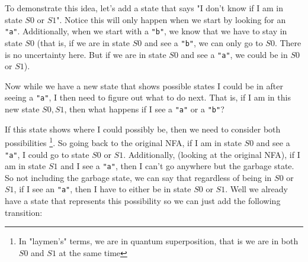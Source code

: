 \documentclass[main.tex]{subfiles}
\begin{document}
To demonstrate this idea, let's add a state that says "I don't know if I am in state $S0$ or $S1$". Notice this will only happen when we start by looking for an \texttt{"a"}. Additionally, when we start with a \texttt{"b"}, we know that we have to stay in state $S0$ (that is, if we are in state $S0$ and see a \texttt{"b"}, we can only go to $S0$. There is no uncertainty here. But if we are in state $S0$ and see a \texttt{"a"}, we could be in $S0$ or $S1$). 
\begin{center}
\end{center}
Now while we have a new state that shows possible states I could be in after seeing a \texttt{"a"}, I then need to figure out what to do next. That is, if I am in this new state $S0,S1$, then what happens if I see a \texttt{"a"} or a \texttt{"b"}? 

If this state shows where I could possibly be, then we need to consider both possibilities \footnote{In "laymen's" terms, we are in quantum superposition, that is we are in both $S0$ and $S1$ at the same time}. So going back to the original NFA, if I am in state $S0$ and see a \texttt{"a"}, I could go to state $S0$ or $S1$. Additionally, (looking at the original NFA), if I am in state $S1$ and I see a \texttt{"a"}, then I can't go anywhere but the garbage state. So not including the garbage state, we can say that regardless of being in $S0$ or $S1$, if I see an \texttt{"a"}, then I have to either be in state $S0$ or $S1$. Well we already have a state that represents this possibility so we can just add the following transition: 
\begin{center}
\end{center}
\end{document}

